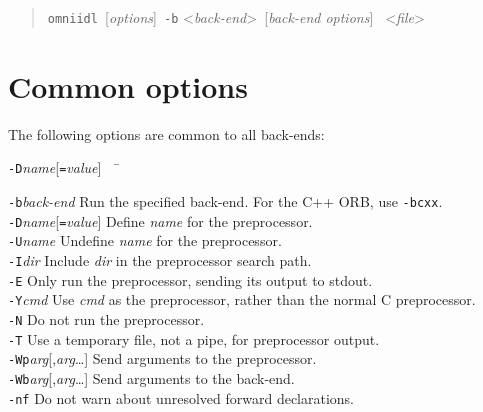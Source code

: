 \documentclass[11pt,oneside,a4paper]{book}
\newcommand{\cmdline}[1]{\texttt{#1}}
\begin{document}
\begin{quote} %
\cmdline{omniidl }[\textit{options}]\cmdline{ -b}%
<\textit{back-end}>\cmdline{ }[\textit{back-end options}]%
\cmdline{ }<\textit{file}>
\end{quote}

\section{Common options}

The following options are common to all back-ends:

\begin{tabbing}
\cmdline{-D}\textit{name}[\cmdline{=}\textit{value}]~~ \= \kill

\cmdline{-b}\textit{back-end}
     \> Run the specified back-end. For the C++ ORB, use \cmdline{-bcxx}.\\

\cmdline{-D}\textit{name}[\cmdline{=}\textit{value}]
     \> Define \textit{name} for the preprocessor.\\

\cmdline{-U}\textit{name}
     \> Undefine \textit{name} for the preprocessor.\\

\cmdline{-I}\textit{dir}
     \> Include \textit{dir} in the preprocessor search path.\\

\cmdline{-E}
     \> Only run the preprocessor, sending its output to stdout.\\

\cmdline{-Y}\textit{cmd}
     \> Use \textit{cmd} as the preprocessor, rather than the normal C
        preprocessor.\\

\cmdline{-N}
     \> Do not run the preprocessor.\\

\cmdline{-T}
     \> Use a temporary file, not a pipe, for preprocessor output.\\

\cmdline{-Wp}\textit{arg}[,\textit{arg}\dots]
     \> Send arguments to the preprocessor.\\

\cmdline{-Wb}\textit{arg}[,\textit{arg}\dots]
     \> Send arguments to the back-end.\\

\cmdline{-nf}
     \> Do not warn about unresolved forward declarations.\\


\end{tabbing}
\end{document}
